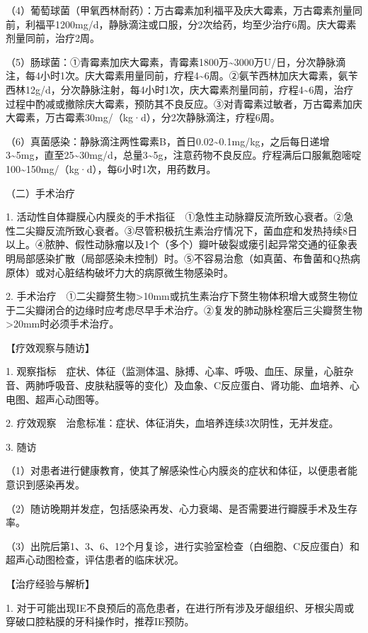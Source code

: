 （4）葡萄球菌（甲氧西林耐药）：万古霉素加利福平及庆大霉素，万古霉素剂量同前，利福平1200mg/d，静脉滴注或口服，分2次给药，均至少治疗6周。庆大霉素剂量同前，治疗2周。

（5）肠球菌：①青霉素加庆大霉素，青霉素1800万\textasciitilde{}3000万U/日，分次静脉滴注，每4小时1次。庆大霉素用量同前，疗程4\textasciitilde{}6周。②氨苄西林加庆大霉素，氨苄西林12g/d，分次静脉注射，每4小时1次，庆大霉素剂量同前，疗程4\textasciitilde{}6周，治疗过程中酌减或撤除庆大霉素，预防其不良反应。③对青霉素过敏者，万古霉素加庆大霉素，万古霉素30mg/（kg·d），分2次静脉滴注，疗程6周。

（6）真菌感染：静脉滴注两性霉素B，首日0.02\textasciitilde{}0.1mg/kg，之后每日递增3\textasciitilde{}5mg，直至25\textasciitilde{}30mg/d，总量3\textasciitilde{}5g，注意药物不良反应。疗程满后口服氟胞嘧啶100\textasciitilde{}150mg/（kg·d），每6小时1次，用药数月。

{（二）手术治疗}

1.
活动性自体瓣膜心内膜炎的手术指征　①急性主动脉瓣反流所致心衰者。②急性二尖瓣反流所致心衰者。③尽管积极抗生素治疗情况下，菌血症和发热持续8日以上。④脓肿、假性动脉瘤以及1个（多个）瓣叶破裂或瘘引起异常交通的征象表明局部感染扩散（局部感染未控制）时。⑤不容易治愈（如真菌、布鲁菌和Q热病原体）或对心脏结构破坏力大的病原微生物感染时。

2.
手术治疗　①二尖瓣赘生物\textgreater{}10mm或抗生素治疗下赘生物体积增大或赘生物位于二尖瓣闭合的边缘时应考虑尽早手术治疗。②复发的肺动脉栓塞后三尖瓣赘生物\textgreater{}20mm时必须手术治疗。

【疗效观察与随访】

1.
观察指标　症状、体征（监测体温、脉搏、心率、呼吸、血压、尿量，心脏杂音、两肺呼吸音、皮肤粘膜等的变化）及血象、C反应蛋白、肾功能、血培养、心电图、超声心动图等。

2. 疗效观察　治愈标准：症状、体征消失，血培养连续3次阴性，无并发症。

3. 随访

（1）对患者进行健康教育，使其了解感染性心内膜炎的症状和体征，以便患者能意识到感染再发。

（2）随访晚期并发症，包括感染再发、心力衰竭、是否需要进行瓣膜手术及生存率。

（3）出院后第1、3、6、12个月复诊，进行实验室检查（白细胞、C反应蛋白）和超声心动图检查，评估患者的临床状况。

【治疗经验与解析】

1.
对于可能出现IE不良预后的高危患者，在进行所有涉及牙龈组织、牙根尖周或穿破口腔粘膜的牙科操作时，推荐IE预防。

